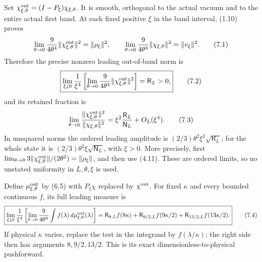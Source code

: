 \documentclass[
  11pt,
]{article}
\begin{document}
Set \(\chi^{\rm out}_{\xi,\theta}=(I-P_\xi)\chi_{\xi,\theta}\). It is
smooth, orthogonal to the actual vacuum and to the entire actual first
band. At each fixed positive \(\xi\) in the band interval, (1.10) proves
\[
 \lim_{\theta\to0}\frac9{4\theta^4}
          \|\chi^{\rm out}_{\xi,\theta}\|^2=\|\rho_\xi\|^2,
 \qquad
 \lim_{\theta\to0}\frac9{4\theta^4}
          \|\chi_{\xi,\theta}\|^2=\|v_\xi\|^2.
\tag{7.1}
\] Therefore the precise nonzero leading out-of-band norm is \[
\boxed{
 \lim_{\xi\downarrow0}\frac1{\xi^4}
 \left[\lim_{\theta\to0}\frac9{4\theta^4}
               \|\chi^{\rm out}_{\xi,\theta}\|^2\right]=\mathsf R_L>0,}
\tag{7.2}
\] and its retained fraction is \[
 \lim_{\theta\to0}
   \frac{\|\chi^{\rm out}_{\xi,\theta}\|^2}{\|\chi_{\xi,\theta}\|^2}
  =\xi^2\frac{\mathsf R_L}{\mathsf N_L}+O_L(\xi^4).
\tag{7.3}
\] In unsquared norms the ordered leading amplitude is
\((2/3)\theta^2\xi^2\sqrt{\mathsf R_L}\); for the whole state it is
\((2/3)\theta^2\xi\sqrt{\mathsf N_L}\), with \(\xi>0\). More precisely,
first \(\lim_{\theta\to0}3\|\chi^{\rm out}_{\xi,\theta}\|/(2\theta^2)
=\|\rho_\xi\|\), and then use (4.11). These are ordered limits, so no
unstated uniformity in \(L,\theta,\xi\) is used.

Define \(\mu^{\rm out}_{\xi,\theta}\) by (6.5) with \(P_\xi\chi\)
replaced by \(\chi^{\rm out}\). For fixed \(\kappa\) and every bounded
continuous \(f\), its full leading measure is \[
\boxed{
 \lim_{\xi\downarrow0}\frac1{\xi^4}
 \left[\lim_{\theta\to0}\frac9{4\theta^4}
     \int f(\lambda)\,d\mu^{\rm out}_{\xi,\theta}(\lambda)\right]
 =\mathsf R_{8,L}f(8\kappa)
  +\mathsf R_{9/2,L}f(9\kappa/2)
  +\mathsf R_{13/2,L}f(13\kappa/2).}
\tag{7.4}
\] If physical \(\kappa\) varies, replace the test in the integrand by
\(f(\lambda/\kappa)\); the right side then has arguments \(8,9/2,13/2\).
This is its exact dimensionless-to-physical pushforward.
\end{document}
